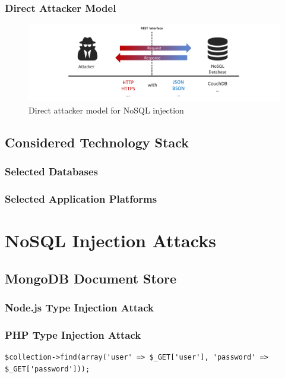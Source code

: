
\subsection{Direct Attacker Model}

\begin{figure}[h]
\centering
  \includegraphics[width=1\linewidth]{Images/attacker_model_direct}
  \caption{Direct attacker model for NoSQL injection}
  \label{fig:extendedAttackerModel}
\end{figure}



\section{Considered Technology Stack}
\subsection{Selected Databases}
\subsection{Selected Application Platforms}


\chapter{NoSQL Injection Attacks}

\section{MongoDB Document Store}
\subsection{Node.js Type Injection Attack}
\subsection{PHP Type Injection Attack}

\begin{lstlisting}[caption={Vulnerable PHP - MongoDb application}, label={lst:PHPArrayInjection}]
$collection->find(array('user' => $_GET['user'], 'password' => $_GET['password']));
\end{lstlisting}


